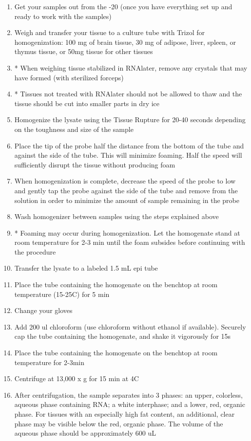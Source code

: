 \documentclass[11pt, oneside]{article}
\begin{document}
\begin{enumerate}
			\item Get your samples out from the -20 (once you have everything set up and ready to work with the samples)
			\item Weigh and transfer your tissue to a culture tube with Trizol for homogenization: 100 mg of brain tissue, 30 mg of adipose, liver, spleen, 			or thymus tissue, or 50mg tissue for other tissues
			\item * When weighing tissue stabilized in RNAlater,  remove any crystals that may have formed (with sterilized forceps)
			\item * Tissues not treated with RNAlater should not be allowed to thaw and the tissue should be cut into smaller parts in dry ice 
			\item Homogenize the lysate using the Tissue Rupture for 20-40 seconds depending on the toughness and size of the sample
			\item Place the tip of the probe half the distance from the bottom of the tube and against the side of the tube. This will minimize foaming. 				Half the speed will sufficiently disrupt the tissue without producing foam
			\item When homogenization is complete, decrease the speed of the probe to low and gently tap the probe against the side of the tube and 			remove from the solution in order to minimize the amount of sample remaining in the probe
			\item Wash homogenizer between samples using the steps explained above
			\item * Foaming may occur during homogenization. Let the homogenate stand at room temperature for 2-3 min until the foam subsides before 			continuing with the procedure
			\item Transfer the lysate to a labeled 1.5 mL epi tube
			\item Place the tube containing the homogenate on the benchtop at room temperature (15-25C) for 5 min
			\item Change your gloves
			\item Add 200 ul chloroform (use chloroform without ethanol if available). Securely cap the tube containing the homogenate, and shake it 				vigorously for 15s
			\item Place the tube containing the homogenate on the benchtop at room temperature for 2-3min
			\item Centrifuge at 13,000 x g for 15 min at 4C
			\item After centrifugation, the sample separates into 3 phases: an upper, colorless, aqueous phase containing RNA; a white interphase; and a 			lower, red, organic phase. For tissues with an especially high fat content, an additional, clear phase may be visible below the red, organic 			phase. The volume of the aqueous phase should be approximately 600 uL

\end{enumerate}
\end{document}
